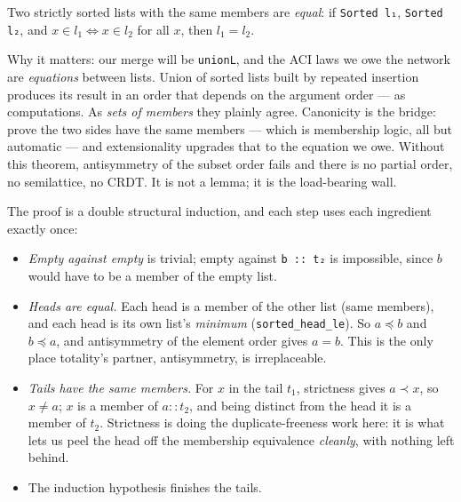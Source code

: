 \documentclass[12pt, a4paper, openright]{book}
\theoremstyle{thmstyle}
\theoremstyle{defstyle}
\newcommand{\lc}[1]{\texttt{#1}}
\newenvironment{thmbox}[1][]{%
  \begin{tcolorbox}[thmbox, title={\ifx\\#1\\Theorem\else#1\fi}]%
}{\end{tcolorbox}}
\begin{document}
\begin{thmbox}[Sorted extensionality]
  Two strictly sorted lists with the same members are \emph{equal}:
  if \lc{Sorted l₁}, \lc{Sorted l₂}, and $x \in l_1 \iff x \in l_2$ for
  all $x$, then $l_1 = l_2$.
\end{thmbox}

Why it matters: our merge will be \lc{unionL}, and the ACI laws we owe
the network are \emph{equations} between lists. Union of sorted lists
built by repeated insertion produces its result in an order that depends
on the argument order --- as computations. As \emph{sets of members}
they plainly agree. Canonicity is the bridge: prove the two sides have
the same members --- which is membership logic, all but automatic ---
and extensionality upgrades that to the equation we owe. Without this
theorem, antisymmetry of the subset order fails and there is no
partial order, no semilattice, no CRDT. It is not a lemma; it is the
load-bearing wall.

The proof is a double structural induction, and each step uses each
ingredient exactly once:

\begin{itemize}
  \item \emph{Empty against empty} is trivial; empty against
    \lc{b :: t₂} is impossible, since $b$ would have to be a member of
    the empty list.
  \item \emph{Heads are equal.} Each head is a member of the other list
    (same members), and each head is its own list's \emph{minimum}
    (\lc{sorted_head_le}). So $a \preccurlyeq b$ and
    $b \preccurlyeq a$, and antisymmetry of the element order gives
    $a = b$. This is the only place totality's partner, antisymmetry,
    is irreplaceable.
  \item \emph{Tails have the same members.} For $x$ in the tail $t_1$,
    strictness gives $a \prec x$, so $x \neq a$; $x$ is a member of
    $a :: t_2$, and being distinct from the head it is a member of
    $t_2$. Strictness is doing the duplicate-freeness work here: it is
    what lets us peel the head off the membership equivalence
    \emph{cleanly}, with nothing left behind.
  \item The induction hypothesis finishes the tails.
\end{itemize}
\end{document}
